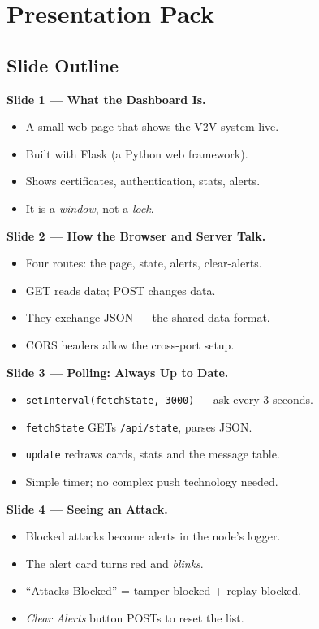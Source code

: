 \documentclass[11pt,a4paper]{article}
\begin{document}
\section{Presentation Pack}

\subsection{Slide Outline}

\textbf{Slide 1 --- What the Dashboard Is.}
\begin{itemize}
  \item A small web page that shows the V2V system live.
  \item Built with Flask (a Python web framework).
  \item Shows certificates, authentication, stats, alerts.
  \item It is a \emph{window}, not a \emph{lock}.
\end{itemize}

\textbf{Slide 2 --- How the Browser and Server Talk.}
\begin{itemize}
  \item Four routes: the page, state, alerts, clear-alerts.
  \item GET reads data; POST changes data.
  \item They exchange JSON --- the shared data format.
  \item CORS headers allow the cross-port setup.
\end{itemize}

\textbf{Slide 3 --- Polling: Always Up to Date.}
\begin{itemize}
  \item \texttt{setInterval(fetchState, 3000)} --- ask every 3 seconds.
  \item \texttt{fetchState} GETs \texttt{/api/state}, parses JSON.
  \item \texttt{update} redraws cards, stats and the message table.
  \item Simple timer; no complex push technology needed.
\end{itemize}

\textbf{Slide 4 --- Seeing an Attack.}
\begin{itemize}
  \item Blocked attacks become alerts in the node's logger.
  \item The alert card turns red and \emph{blinks}.
  \item ``Attacks Blocked'' = tamper blocked + replay blocked.
  \item \emph{Clear Alerts} button POSTs to reset the list.
\end{itemize}
\end{document}
